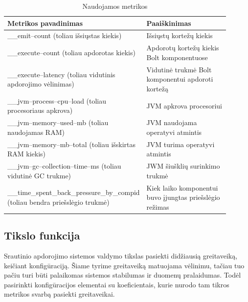 \documentclass{VUMIFPSbakalaurinis}
\begin{document}
\begin{longtable}{|p{0.5\linewidth}|p{0.4\linewidth}|}
    \caption{Naudojamos metrikos}
    \label{metrics–table}\\
    \hline
    \rowcolor[HTML]{C0C0C0} 
    Metrikos pavadinimas                                  & Paaiškinimas            \\ \hline
    \endfirsthead
    \endhead
    \_\_emit–count (toliau išsiųstas kiekis)                           & Išsiųstų kortežų kiekis                    \\ \hline
    \_\_execute–count  (toliau apdorotas kiekis)                       & Apdorotų kortežų kiekis Bolt komponentuose \\ \hline
    \_\_execute–latency  (toliau vidutinis apdorojimo vėlinimas)       & Vidutinė trukmė Bolt komponentui apdoroti kortežą                                          \\ \hline
    \_\_jvm–process–cpu–load  (toliau procesoriaus apkrova)            & JVM apkrova procesoriui     \\ \hline
    \_\_jvm–memory–used–mb    (toliau naudojamas RAM)                  & JVM naudojama operatyvi atmintis       \\ \hline
    \_\_jvm–memory–mb–total     (toliau išskirtas RAM kiekis)          & JVM turima operatyvi atmintis    \\ \hline
    \_\_jvm–gc–collection–time–ms  (toliau vidutinė GC trukme)         & JWM šiušklių surinkimo trukmė     \\ \hline
    \_\_time\_spent\_back\_pressure\_by\_compid  (toliau bendra priešslėgio trukmė)  & Kiek laiko komponentui buvo įjungtas priešslėgio režimas  \\ \hline
\end{longtable}

\subsection{Tikslo funkcija}

Srautinio apdorojimo sistemos valdymo tikslas pasiekti didžiausią greitaveiką, keičiant konfigūraciją. Šiame tyrime greitaveiką matuojama vėlinimu, tačiau tuo pačiu turi būti palaikomas sistemos stabilumas ir duomenų pralaidumas. Todėl pasirinkti konfigūracijos elementai su koeficientais, kurie nurodo tam tikros metrikos svarbą pasiekti greitaveikai. 
\end{document}
